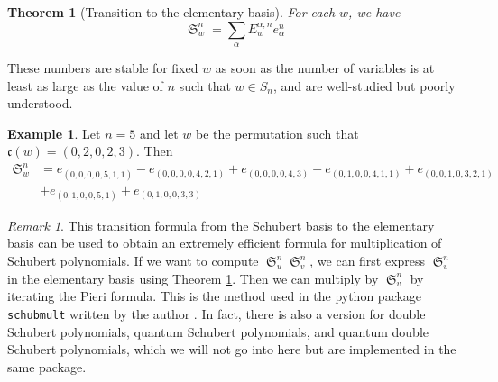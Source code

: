 \documentclass{amsart}
\newtheorem{theorem}{Theorem}[section]
\theoremstyle{definition}
\newtheorem{example}[lemma]{Example}
\theoremstyle{remark}
\newtheorem*{remark}{Remark}
\numberwithin{equation}{subsection}
\DeclareMathOperator{\sch}{\mathfrak{S}}
\newcommand{\code}{\mathfrak{c}}
\begin{document}
\begin{theorem}[Transition to the elementary basis] \label{theorem:elemtrans}
	For each $w$, we have
	$$\sch_w^n = \sum_{\alpha}E_w^{\alpha;n}e_{\alpha}^n$$
\end{theorem}
These numbers are stable for fixed $w$ as soon as the number of variables is at least as large as the value of $n$ such that $w\in S_n$, and are well-studied but poorly understood.

\begin{example}
	Let $n=5$ and let $w$ be the permutation such that $\code(w)=(0,2,0,2,3)$. Then
	\begin{align*}
		\sch_w^n &= e_{(0,0,0,0,5,1,1)} - e_{(0,0,0,0,4,2,1)} + e_{(0,0,0,0,4,3)}- e_{(0,1,0,0,4,1,1)} +e_{(0,0,1,0,3,2,1)}\\
		&+e_{(0,1,0,0,5,1)} + e_{(0,1,0,0,3,3)}
	\end{align*}
\end{example}

\begin{remark}
This transition formula from the Schubert basis to the elementary basis can be used to obtain an extremely efficient formula for multiplication of Schubert polynomials. If we want to compute $\sch_u^n\sch_v^n$, we can first express $\sch_v^n$ in the elementary basis using Theorem \ref{theorem:elemtrans}. Then we can multiply by $\sch_v^n$ by iterating the Pieri formula. This is the method used in the python package \verb|schubmult| written by the author \cite{schubmult}. In fact, there is also a version for double Schubert polynomials, quantum Schubert polynomials, and quantum double Schubert polynomials, which we will not go into here but are implemented in the same package.
\end{remark}


\end{document}
